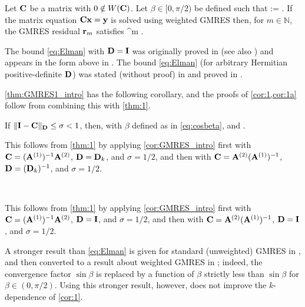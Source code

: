 
\begin{theorem}\label{thm:GMRES1_intro} 
Let $\mathbf{C}$ be a matrix with $0\notin W(\mathbf{C})$. Let $\beta\in[0,\pi/2)$ be defined such that
\beq\label{eq:cosbeta}
\cos \beta := .
\eeq
If the matrix equation $\mathbf{C} \mathbf{x} = \mathbf{y}$ is solved using weighted GMRES then, 
for $m\in \mathbb{N}$, the GMRES residual $\mathbf{r}_m$ %
satisfies
\beq\label{eq:Elman}
 \leq \sin^m \beta. %
\eeq
\end{theorem}
The bound \cref{eq:Elman} with $\mathbf{D}=\mathbf{I}$ was originally proved in \cite{El:82} (see also \cite[Theorem 3.3]{EiElSc:83}) and appears in the form above in \cite[Equation 1.2]{BeGoTy:06}. The bound \cref{eq:Elman} (for arbitrary Hermitian positive-definite $\mathbf{D}$) was stated (without proof) in \cite{CaWi:92} and proved in \cite[Theorem 5.1]{GrSpVa:17}. %



\cref{thm:GMRES1_intro} has the following corollary, and the proofs of \cref{cor:1,cor:1a} follow from combining this with \cref{thm:1}.

\begin{corollary}
\label{cor:GMRES_intro} 
If $\|\mathbf{I} - \mathbf{C} \|_{\mathbf{D}} \leq \sigma < 1$, then, with $\beta$ defined as in \cref{eq:cosbeta},
\beqs
\cos \beta \geq {}\eeqs
and
\beq\label{eq:gmressin}
\sin \beta \leq {}.
\eeq
\end{corollary}

This follows from \cref{thm:1} by applying \cref{cor:GMRES_intro} first with $\mathbf{C}= (\mathbf{A}^{(1)})^{-1} \mathbf{A}^{(2)}$, $\mathbf{D}=\mathbf{D}_k$, and $\sigma=1/2$, and then with $\mathbf{C}= \mathbf{A}^{(2)}(\mathbf{A}^{(1)})^{-1} $, $\mathbf{D}=(\mathbf{D}_k)^{-1}$, and $\sigma=1/2$.
\epf

\

This follows from \cref{thm:1} by applying \cref{cor:GMRES_intro} first with $\mathbf{C}= (\mathbf{A}^{(1)})^{-1} \mathbf{A}^{(2)}$, $\mathbf{D}=\mathbf{I}$, and $\sigma=1/2$, and then with $\mathbf{C}= \mathbf{A}^{(2)}(\mathbf{A}^{(1)})^{-1} $, $\mathbf{D}=\mathbf{I}$, and $\sigma=1/2$.
\epf


A stronger result than \cref{eq:Elman} is given for standard (unweighted) GMRES in \cite[Theorem 2.1]{BeGoTy:06}, and then converted to a result about weighted GMRES in \cite[Theorem 5.3]{BoDoGrSpTo:19}; indeed, the convergence factor $\sin \beta$ is replaced by a function of $\beta$ strictly less than $\sin\beta$ for $\beta\in (0,\pi/2)$. Using this stronger result, however, does not improve the $k$-dependence of \cref{cor:1}.
\ere


